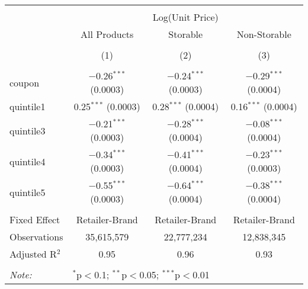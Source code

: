 
\begin{table}[!htbp] \centering 
  \caption{} 
  \label{tab:overallSavings} 
\begin{tabular}{@{\extracolsep{5pt}}lccc} 
\\[-1.8ex]\hline 
\hline \\[-1.8ex] 
 & \multicolumn{3}{c}{Log(Unit Price)} \\ 
\cline{2-4} 
 & All Products & Storable & Non-Storable \\ 
\\[-1.8ex] & (1) & (2) & (3)\\ 
\hline \\[-1.8ex] 
 coupon & $-$0.26$^{***}$ (0.0003) & $-$0.24$^{***}$ (0.0003) & $-$0.29$^{***}$ (0.0004) \\ 
  quintile1 & 0.25$^{***}$ (0.0003) & 0.28$^{***}$ (0.0004) & 0.16$^{***}$ (0.0004) \\ 
  quintile3 & $-$0.21$^{***}$ (0.0003) & $-$0.28$^{***}$ (0.0004) & $-$0.08$^{***}$ (0.0004) \\ 
  quintile4 & $-$0.34$^{***}$ (0.0003) & $-$0.41$^{***}$ (0.0004) & $-$0.23$^{***}$ (0.0003) \\ 
  quintile5 & $-$0.55$^{***}$ (0.0003) & $-$0.64$^{***}$ (0.0004) & $-$0.38$^{***}$ (0.0004) \\ 
 \hline \\[-1.8ex] 
Fixed Effect & Retailer-Brand & Retailer-Brand & Retailer-Brand \\ 
Observations & 35,615,579 & 22,777,234 & 12,838,345 \\ 
Adjusted R$^{2}$ & 0.95 & 0.96 & 0.93 \\ 
\hline 
\hline \\[-1.8ex] 
\textit{Note:}  & \multicolumn{3}{l}{$^{*}$p$<$0.1; $^{**}$p$<$0.05; $^{***}$p$<$0.01} \\ 
\end{tabular} 
\end{table} 
